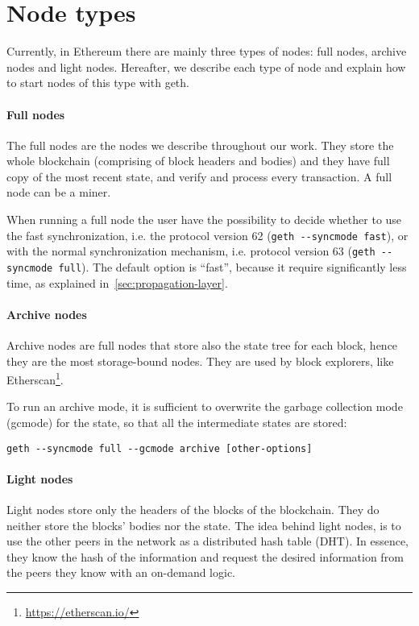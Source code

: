 \section{Node types}
\label{sec:node-types}
Currently, in Ethereum there are mainly three types of nodes: full nodes,
archive nodes and light nodes. Hereafter, we describe each type of node and
explain how to start nodes of this type with geth.

\paragraph{Full nodes}
The full nodes are the nodes we describe throughout our work. They store the
whole blockchain (comprising of block headers and bodies) and they have full
copy of the most recent state, and verify and process every transaction. A full
node can be a miner.

When running a full node the user have the possibility to decide whether to use
the fast synchronization, i.e. the protocol version 62
(\verb|geth --syncmode fast|), or with the normal synchronization mechanism,
i.e. protocol version 63 (\verb|geth --syncmode full|). The default option is
``fast'', because it require significantly less time, as explained
in~\autoref{sec:propagation-layer}.

\paragraph{Archive nodes}
Archive nodes are full nodes that store also the state tree for each block,
hence they are the most storage-bound nodes. They are used by block explorers,
like Etherscan\footnote{\url{https://etherscan.io/}}.

To run an archive mode, it is sufficient to overwrite the garbage collection
mode (gcmode) for the state, so that all the intermediate states are stored:
\begin{center}
\verb|geth --syncmode full --gcmode archive [other-options]|
\end{center}

\paragraph{Light nodes}
Light nodes store only the headers of the blocks of the blockchain. They do
neither store the blocks' bodies nor the state. The idea behind light nodes, is
to use the other peers in the network as a distributed hash table (DHT).
In essence, they know the hash of the information and request the desired
information from the peers they know with an on-demand logic.

